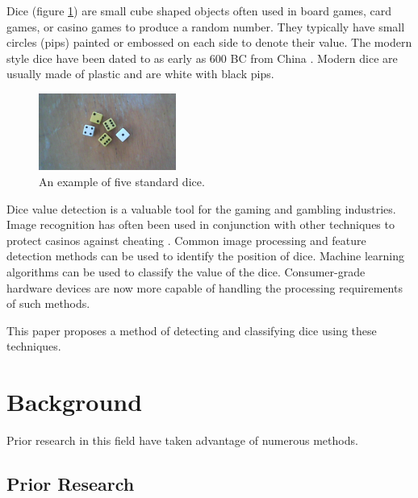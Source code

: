 \documentclass[conference]{IEEEtran}
\begin{document}
Dice (figure \ref{fig:original}) are small cube shaped objects often used in board games, card games, or casino games to produce a random number.
They typically have small circles (pips) painted or embossed on each side to denote their value.
The modern style dice have been dated to as early as 600 BC from China \cite{Romanowski2020}.
Modern dice are usually made of plastic and are white with black pips.
\begin{figure}[H]
	\centering
	\includegraphics[width=0.4\textwidth]{original}
	\caption{An example of five standard dice.}
	\label{fig:original}
\end{figure}

Dice value detection is a valuable tool for the gaming and gambling industries.
Image recognition has often been used in conjunction with other techniques to protect casinos against cheating \cite{4129523}\cite{Correia1995}.
Common image processing and feature detection methods can be used to identify the position of dice.
Machine learning algorithms can be used to classify the value of the dice.
Consumer-grade hardware devices are now more capable of handling the processing requirements of such methods.

This paper proposes a method of detecting and classifying dice using these techniques.

\section{Background}


Prior research in this field have taken advantage of numerous methods.

\subsection{Prior Research}
\end{document}

